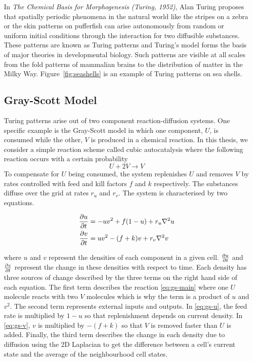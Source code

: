 In \textit{The Chemical Basis for Morphogenesis (Turing, 1952)}\cite{turing1990chemical}, Alan Turing proposes that spatially periodic phenomena in the natural world like the stripes on a zebra or the skin patterns on pufferfish can arise autonomously from random or uniform initial conditions through the interaction for two diffusible substances. These patterns are known as Turing patterns and Turing's model forms the basis of major theories in developmental biology. Such patterns are visible at all scales from the fold patterns of mammalian brains\cite{cartwright2002labyrinthine} to the distribution of matter in the Milky Way\cite{smolin1996galactic}. Figure~\ref{fig:seashells} is an example of Turing patterns on sea shells.

\subsection{Gray-Scott Model}

Turing patterns arise out of two component reaction-diffusion systems. One specific example is the Gray-Scott model\cite{gray1983autocatalytic} in which one component, $U$, is consumed while the other, $V$ is produced in a chemical reaction. In this thesis, we consider a simple reaction scheme called cubic autocatalysis where the following reaction occurs with a certain probability
\begin{equation}\label{eq:gs-main}
  U + 2V \rightarrow V
\end{equation}
To compensate for $U$ being consumed, the system replenishes $U$ and removes $V$ by rates controlled with feed and kill factors $f$ and $k$ respectively. The substances diffuse over the grid at rates $r_u$ and $r_v$. The system is characterised by two equations.
\begin{definition} \label{def:reaction-diffusion}
\begin{align} 
  \label{eq:gs-u} \pdv{u}{t} &= -uv^2 + f(1-u) + r_u \nabla^2 u\\
  \label{eq:gs-v} \pdv{v}{t} &= uv^2 - (f+k)v + r_v \nabla^2 v
\end{align}
\end{definition}
where $u$ and $v$ represent the densities of each component in a given cell. $\pdv{u}{t}$ and $\pdv{v}{t}$ represent the change in these densities with respect to time. Each density has three sources of change described by the three terms on the right hand side of each equation. The first term describes the reaction \ref{eq:gs-main} where one $U$ molecule reacts with two $V$ molecules which is why the term is a product of $u$ and $v^2$. The second term represents external inputs and outputs. In \ref{eq:gs-u}, the feed rate is multiplied by $1-u$ so that replenishment depends on current density. In \ref{eq:gs-v}, $v$ is multiplied by $-(f+k)$ so that $V$ is removed faster than $U$ is added. Finally, the third term describes the change in each density due to diffusion using the 2D Laplacian to get the difference between a cell's current state and the average of the neighbourhood cell states.\\

